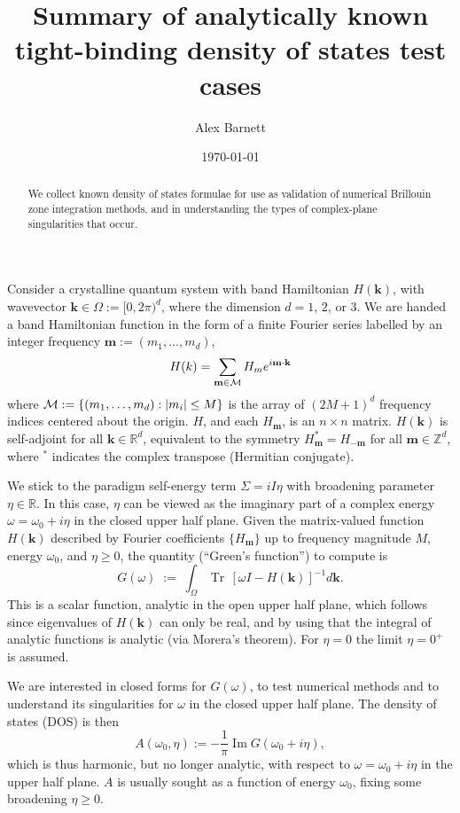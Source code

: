 \documentclass[11pt]{article}
\newcommand{\be}{\begin{equation}}
\newcommand{\ee}{\end{equation}}
\newcommand{\mbf}[1]{{\mathbf #1}}
\newcommand{\R}{\mathbb{R}}
\newcommand{\Z}{\mathbb{Z}}
\DeclareMathOperator{\im}{Im}
\DeclareMathOperator{\tr}{Tr}
\newcommand{\om}{\omega}
\newcommand{\BZ}{\Omega}
\newcommand{\kk}{\mbf{k}}
\newcommand{\mm}{\mbf{m}}
\begin{document}
\title{Summary of analytically known tight-binding density of states test cases}
\author{Alex Barnett}
\date{\today}
\maketitle
\begin{abstract}
  We collect known density of states formulae for use as validation
  of numerical Brillouin zone integration methods, and in understanding
  the types of complex-plane singularities that occur.
\end{abstract}

Consider a crystalline quantum system with band Hamiltonian $H(\kk)$,
with wavevector $\kk\in \BZ := [0,2\pi)^d$, where the dimension $d=1$, $2$, or $3$.
We are handed a band Hamiltonian function in the form of a finite Fourier
series labelled by an integer frequency $\mm := (m_1,\dots,m_d)$,
\be
H(k) = \sum_{\mm\in{\cal M}} H_m e^{i\mm\cdot \kk}
\label{Hk}
\ee
where ${\cal M} := \{(m_1,\dots,m_d): |m_i|\le M\}$ is the array of 
$(2M+1)^d$ frequency indices centered about the origin.
$H$, and each $H_\mm$, is an $n\times n$ matrix.
$H(\kk)$ is self-adjoint for all $\kk\in\R^d$,
equivalent to the symmetry $H_\mm^* = H_{-\mm}$ for all $\mm\in\Z^d$, where
$^*$ indicates the complex transpose (Hermitian conjugate).

We stick to the paradigm self-energy term $\Sigma = iI\eta$
with broadening parameter $\eta\in\R$.
In this case, $\eta$ can be viewed as the imaginary part of
a complex energy $\om = \om_0 + i\eta$ in the closed upper half plane.
Given the matrix-valued function $H(\kk)$
described by Fourier coefficients $\{H_\mm\}$ up to frequency magnitude $M$,
energy $\om_0$, and $\eta\ge0$,
the quantity (``Green's function'') to compute is
\be
G(\om) \;:=\;
\int_\BZ \tr\, [\om I - H(\kk)]^{-1} d\kk.
\label{G}
\ee
This is a scalar function, analytic in the open upper half plane,
which follows since eigenvalues of $H(\kk)$ can only be real, and by
using that the integral of analytic functions is analytic (via Morera's theorem).
For $\eta=0$ the limit $\eta=0^+$ is assumed.

We are interested in closed forms for $G(\om)$, to
test numerical methods and to understand
its singularities for $\om$ in the closed upper half plane.
The density of states (DOS) is then
\be
A(\om_0,\eta) := -\frac{1}{\pi}\im G(\om_0+i\eta),
\label{DOS}
\ee
which is thus harmonic, but no longer analytic, with respect to $\om=\om_0+i\eta$ in the upper half plane.
$A$ is usually sought as a function of energy $\om_0$,
fixing some broadening $\eta\ge0$.
\end{document}
